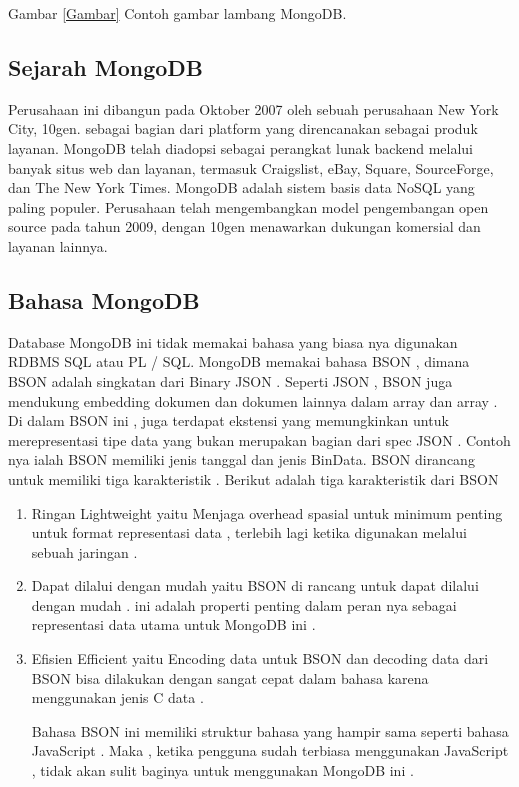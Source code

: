       Gambar \ref{Gambar} Contoh gambar lambang MongoDB.

\subsection{Sejarah MongoDB}
Perusahaan ini dibangun pada Oktober 2007 oleh sebuah perusahaan New York City, 10gen. sebagai bagian dari platform yang direncanakan sebagai produk layanan.
MongoDB telah diadopsi sebagai perangkat lunak backend melalui banyak situs web dan layanan, termasuk Craigslist, eBay, Square, SourceForge, dan The New York Times. MongoDB adalah sistem basis data NoSQL yang paling populer. 
Perusahaan telah mengembangkan model pengembangan open source pada tahun 2009, dengan 10gen menawarkan dukungan komersial dan layanan lainnya.

\subsection{Bahasa MongoDB}
Database MongoDB ini tidak memakai bahasa yang biasa nya digunakan RDBMS SQL atau PL / SQL. MongoDB memakai bahasa BSON , dimana BSON adalah singkatan dari Binary JSON . Seperti JSON , BSON juga mendukung embedding dokumen dan dokumen lainnya dalam array dan array . Di dalam BSON ini , juga terdapat ekstensi yang memungkinkan untuk merepresentasi tipe data yang bukan merupakan bagian dari spec JSON . Contoh nya ialah BSON memiliki jenis tanggal dan jenis BinData. BSON dirancang untuk memiliki tiga karakteristik . Berikut adalah tiga karakteristik dari BSON 
\begin{enumerate}
\item 
	Ringan Lightweight yaitu Menjaga overhead spasial untuk minimum penting untuk format representasi data , terlebih lagi ketika digunakan melalui sebuah jaringan .
\item
	Dapat dilalui dengan mudah yaitu BSON di rancang untuk dapat dilalui dengan mudah . ini adalah properti penting dalam peran nya sebagai representasi data utama untuk MongoDB ini . 
\item
	Efisien Efficient yaitu Encoding data untuk BSON dan decoding data dari BSON bisa dilakukan dengan sangat cepat dalam bahasa karena menggunakan jenis C data . 

	Bahasa BSON ini memiliki struktur bahasa yang hampir sama seperti bahasa JavaScript . Maka , ketika pengguna sudah terbiasa menggunakan JavaScript , tidak akan sulit baginya untuk menggunakan MongoDB ini .
\end{enumerate}

